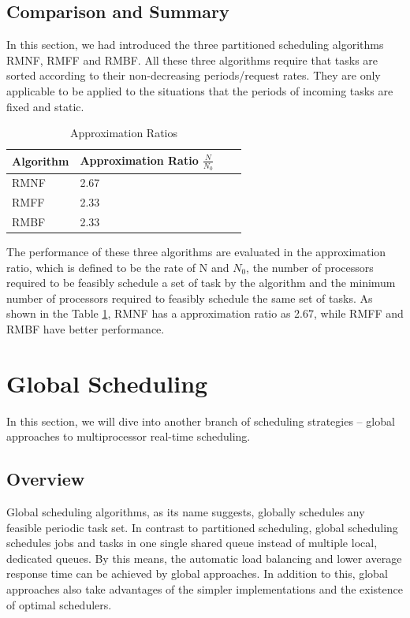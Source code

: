 \documentclass[preprint,12pt]{elsarticle}
\begin{document}
\subsection{Comparison and Summary}
In this section, we had introduced the three partitioned scheduling algorithms RMNF, RMFF and RMBF. All these three algorithms require that tasks are sorted according to their non-decreasing periods/request rates. They are only applicable to be applied to the situations that the periods of incoming tasks are fixed and static. 
\begin{table}
\begin{center}
\caption{Approximation Ratios}
\label{table: app_ratio}
 \begin{tabular}{| l | l | l | l |}
    \hline
    {\bf Algorithm} & {\bf Approximation Ratio $\frac{N}{N_0}$} \\ \hline
    RMNF & 2.67 \\ \hline
    RMFF & 2.33 \\ \hline
    RMBF & 2.33 \\ \hline
 \end{tabular}
 \end{center}
\end{table} 
The performance of these three algorithms are evaluated in the approximation ratio, which is defined to be the rate of N and $N_0$, the number of processors required to be feasibly schedule a set of task by the algorithm and the minimum number of processors required to feasibly schedule the same set of tasks. As shown in the Table \ref{table: app_ratio}, RMNF has a approximation ratio as 2.67, while RMFF and RMBF have better performance.

\newpage
\section{Global Scheduling} \label{S:4}
In this section, we will dive into another branch of scheduling strategies --
global approaches to multiprocessor real-time scheduling.

\subsection{Overview}
Global scheduling algorithms, as its name suggests, globally schedules any
feasible periodic task set. In contrast to partitioned scheduling, global
scheduling schedules jobs and tasks in one single shared queue instead of
multiple local, dedicated queues. By this means, the automatic load balancing
and lower average response time can be achieved by global approaches. In
addition to this, global approaches also take advantages of the simpler
implementations and the existence of optimal schedulers. 
\end{document}
